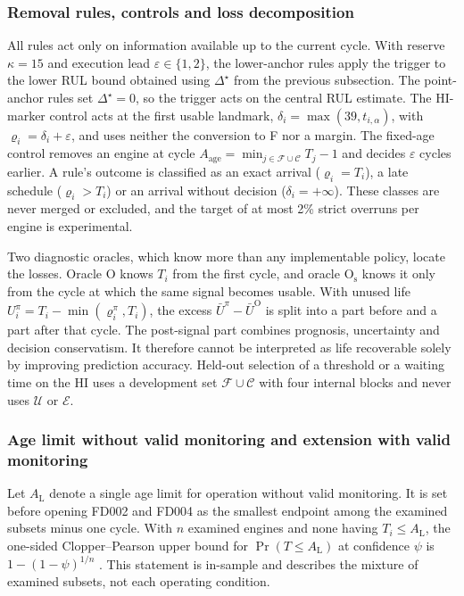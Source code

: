 \documentclass[preprint,12pt]{elsarticle}
\begin{document}
\subsubsection{Removal rules, controls and loss decomposition}

All rules act only on information available up to the current cycle. With reserve $\kappa=15$ and execution lead $\varepsilon\in\{1,2\}$, the lower-anchor rules apply the trigger to the lower RUL bound obtained using $\Delta^{\star}$ from the previous subsection. The point-anchor rules set $\Delta^{\star}=0$, so the trigger acts on the central RUL estimate. The HI-marker control acts at the first usable landmark, $\delta_i=\max(39,t_{i,\alpha})$, with $\varrho_i=\delta_i+\varepsilon$, and uses neither the conversion to F nor a margin. The fixed-age control removes an engine at cycle $A_{\mathrm{age}}=\min_{j\in\mathcal F\cup\mathcal C}T_j-1$ and decides $\varepsilon$ cycles earlier. A rule's outcome is classified as an exact arrival ($\varrho_i=T_i$), a late schedule ($\varrho_i>T_i$) or an arrival without decision ($\delta_i=+\infty$). These classes are never merged or excluded, and the target of at most 2\% strict overruns per engine is experimental.

Two diagnostic oracles, which know more than any implementable policy, locate the losses. Oracle $\mathrm O$ knows $T_i$ from the first cycle, and oracle $\mathrm O_{\mathrm s}$ knows it only from the cycle at which the same signal becomes usable. With unused life $U_i^{\pi}=T_i-\min(\varrho_i^{\pi},T_i)$, the excess $\bar U^{\pi}-\bar U^{\mathrm O}$ is split into a part before and a part after that cycle. The post-signal part combines prognosis, uncertainty and decision conservatism. It therefore cannot be interpreted as life recoverable solely by improving prediction accuracy. Held-out selection of a threshold or a waiting time on the HI uses a development set $\mathcal F\cup\mathcal C$ with four internal blocks and never uses $\mathcal U$ or $\mathcal E$.

\subsubsection{Age limit without valid monitoring and extension with valid monitoring}\label{sec:monitoring}

Let $A_{\mathrm L}$ denote a single age limit for operation without valid monitoring.  It is set before opening FD002 and FD004 as the smallest endpoint among the examined subsets minus one cycle. With $n$ examined engines and none having $T_i\leq A_{\mathrm L}$, the one-sided Clopper--Pearson upper bound for $\Pr(T\leq A_{\mathrm L})$ at confidence $\psi$ is $1-(1-\psi)^{1/n}$ \cite{Clopper1934}. This statement is in-sample and describes the mixture of examined subsets, not each operating condition.
\end{document}
